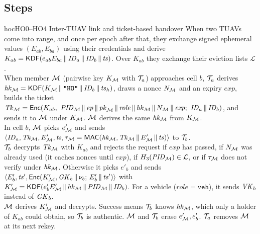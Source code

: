 \subsection{Steps}
\begin{stepbox}{hoc}{HO0--HO4 \;Inter-TUAV link and ticket-based handover}
 When two TUAVs come into range, and once per epoch after that, they exchange signed ephemeral values $(E_{ab},E_{ba})$ using their
credentials and derive $K_{ab}=\mathsf{KDF}(e_{ab}E_{ba}\,\|\,\mathit{ID}_a\,\|\,\mathit{ID}_b\,\|\,\mathit{ts})$. Over $K_{ab}$ they exchange their eviction lists $\mathcal{L}$.\\[2pt]
 When member $\mathcal{M}$ (pairwise key $K_{\mathcal{M}}$ with $\mathcal{T}_a$) approaches cell $b$, $\mathcal{T}_a$ derives $\mathit{hk}_{\mathcal{M}}=\mathsf{KDF}(K_{\mathcal{M}}\,\|\,\texttt{"HO"}\,\|\,\mathit{ID}_b\,\|\,\mathit{ts}_h)$,
draws a nonce $N_{\mathcal{M}}$ and an expiry $\mathit{exp}$, builds the ticket
$\Tk_\M=\Enc(K_{ab},\ \PID_\M\cat\ep\cat\pk_\M\cat\mathit{role}\cat\hk_\M\cat N_\M\cat\mathit{exp};\ \ID_a\cat\ID_b)$, and sends it to $\mathcal{M}$ under $K_{\mathcal{M}}$.
$\mathcal{M}$ derives the same $\mathit{hk}_{\mathcal{M}}$ from $K_{\mathcal{M}}$.\\[2pt]
 In cell $b$, $\mathcal{M}$ picks $e'_{\mathcal{M}}$ and sends $\langle\mathit{ID}_a,\mathit{Tk}_{\mathcal{M}},E'_{\mathcal{M}},\mathit{ts},\tau_{\mathcal{M}}=\mathsf{MAC}(\mathit{hk}_{\mathcal{M}},\mathit{Tk}_{\mathcal{M}}\,\|\, E'_{\mathcal{M}}\,\|\,\mathit{ts})\rangle$ to $\mathcal{T}_b$.\\[2pt]
 $\mathcal{T}_b$ decrypts $\mathit{Tk}_{\mathcal{M}}$ with $K_{ab}$ and rejects the request if $\mathit{exp}$ has passed, if $N_{\mathcal{M}}$ was already used (it caches nonces until
$\mathit{exp}$), if $H_3(\mathit{PID}_{\mathcal{M}})\in\mathcal{L}$, or if $\tau_{\mathcal{M}}$ does not verify under $\mathit{hk}_{\mathcal{M}}$. Otherwise it picks $e'_b$ and sends
$\langle E'_b,\mathit{ts}',\mathsf{Enc}(K'_{\mathcal{M}},\mathit{GK}_b\,\|\,\nu_b;\,E'_b\,\|\,\mathit{ts}')\rangle$ with $K'_{\mathcal{M}}=\mathsf{KDF}(e'_bE'_{\mathcal{M}}\,\|\,\mathit{hk}_{\mathcal{M}}\,\|\,\mathit{PID}_{\mathcal{M}}\,\|\,\mathit{ID}_b)$. For a vehicle
($\mathit{role}=\texttt{veh}$), it sends $\mathit{VK}_b$ instead of $\mathit{GK}_b$.\\[2pt]
 $\mathcal{M}$ derives $K'_{\mathcal{M}}$ and decrypts. Success means $\mathcal{T}_b$ knows $\mathit{hk}_{\mathcal{M}}$, which only a holder of $K_{ab}$ could obtain, so $\mathcal{T}_b$ is authentic.
$\mathcal{M}$ and $\mathcal{T}_b$ erase $e'_{\mathcal{M}},e'_b$. $\mathcal{T}_a$ removes $\mathcal{M}$ at its next rekey.
\end{stepbox}

